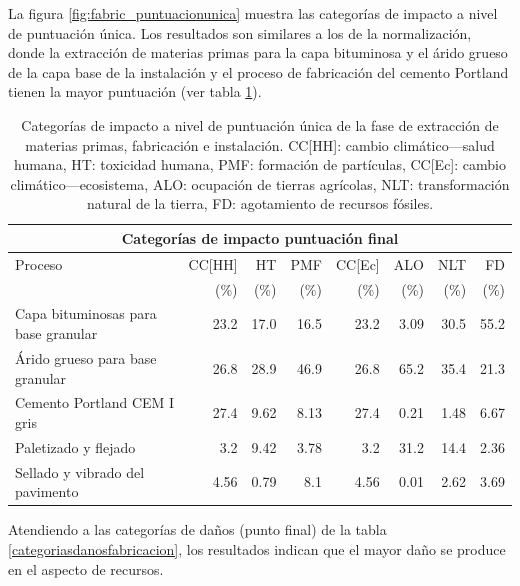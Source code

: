 La figura \ref{fig:fabric_puntuacionunica} muestra las categorías de impacto a nivel de puntuación única. Los resultados son similares a los de la normalización, donde la extracción de materias primas para la capa bituminosa y el árido grueso de la capa base de la instalación y el proceso de fabricación del cemento Portland tienen la mayor puntuación (ver tabla \ref{categoriasimpactofabricacionpuntunica}).

\begin{table}[!htb]
\centering
\begin{tabular}{p{4cm}rrrrrrr}
\toprule
\multicolumn{8}{c}{Categorías de impacto puntuación final}\\
\midrule
Proceso & CC[HH] & HT & PMF & CC[Ec] & ALO & NLT & FD\\
 &  (\%) & (\%) & (\%) & (\%) & (\%) & (\%) & (\%)\\
\midrule
Capa bituminosas para base granular & 23.2 & 17.0 & 16.5 & 23.2 & 3.09 & 30.5 & 55.2\\
Árido grueso para base granular & 26.8 & 28.9 & 46.9 & 26.8 & 65.2 & 35.4 & 21.3\\
Cemento Portland CEM I gris & 27.4 & 9.62 & 8.13 & 27.4 & 0.21 & 1.48 & 6.67\\
Paletizado y flejado & 3.2 & 9.42 & 3.78 & 3.2 & 31.2 & 14.4 & 2.36\\
Sellado y vibrado del pavimento & 4.56 & 0.79 & 8.1 & 4.56 & 0.01 & 2.62 & 3.69\\
\bottomrule
\end{tabular}
\caption[Categorías de impacto a nivel de puntuación única de la fase de extracción de materias primas, fabricación e instalación.]{Categorías de impacto a nivel de puntuación única de la fase de extracción de materias primas, fabricación e instalación. CC[HH]: cambio climático—salud humana, HT: toxicidad humana, PMF: formación de partículas, CC[Ec]: cambio climático—ecosistema, ALO: ocupación de tierras agrícolas, NLT: transformación natural de la tierra, FD: agotamiento de recursos fósiles.}
\label{categoriasimpactofabricacionpuntunica}
\end{table}

Atendiendo a las categorías de daños (punto final) de la tabla \ref{categoriasdanosfabricacion}, los resultados indican que el mayor daño se produce en el aspecto de recursos.

